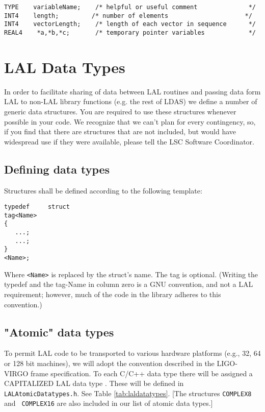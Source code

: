 \documentclass[]{ligodcc}
\begin{document}
{\footnotesize
\begin{verbatim}
TYPE    variableName;    /* helpful or useful comment              */
INT4    length;         /* number of elements                     */
INT4    vectorLength;    /* length of each vector in sequence      */
REAL4    *a,*b,*c;       /* temporary pointer variables            */
\end{verbatim}}

\section{LAL Data Types}
\label{sec:laldatatypes}

In order to facilitate sharing of data between LAL routines and
passing data form LAL to non-LAL library functions (e.g. the rest of
LDAS) we define a number of generic data structures. You are required
to use these structures whenever possible in your code.  We recognize
that we can't plan for every contingency, so, if you find that there
are structures that are not included, but would have widespread use if
they were available, please tell the LSC Software Coordinator.

\subsection{Defining data types}
Structures shall be defined according to the following template:
\begin{verbatim}
typedef 	struct
tag<Name>
{
   ...;
   ...;
}
<Name>;
\end{verbatim}

Where {\tt <Name>} is replaced by the struct's name. The tag is
optional.  (Writing the typedef  and the tag-Name in column zero is a
GNU convention, and not a LAL requirement; however, much of the code
in the library adheres to this convention.)

\subsection{"Atomic" data types}
\label{atomic}

To permit LAL code to be transported to various hardware platforms
(e.g., 32, 64 or 128 bit machines), we will adopt the convention
described in the LIGO-VIRGO frame specification. To each C/C++ data
type there will be assigned a CAPITALIZED LAL data type . These
will be defined in {\tt LALAtomicDatatypes.h}.  See  Table
\ref{tab:laldatatypes}.  [The structures {\tt COMPLEX8} and {\tt
COMPLEX16} are also included in our list of atomic data types.]
\end{document}

